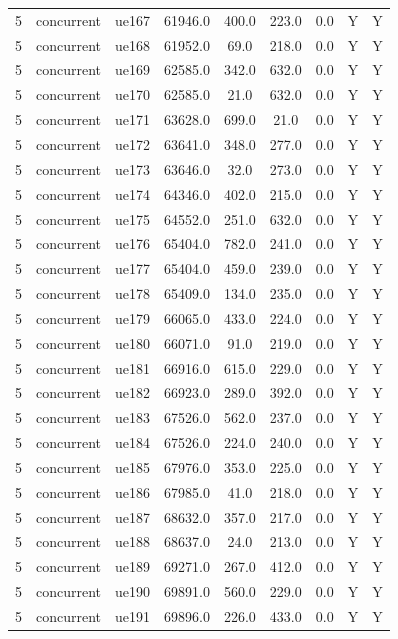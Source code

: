 \begin{table}[ht]
\begin{tabular}{|c|c|c|c|c|c|c|c|c|}
5 & concurrent & ue167 & 61946.0 & 400.0 & 223.0 & 0.0 & Y & Y \\
5 & concurrent & ue168 & 61952.0 & 69.0 & 218.0 & 0.0 & Y & Y \\
5 & concurrent & ue169 & 62585.0 & 342.0 & 632.0 & 0.0 & Y & Y \\
5 & concurrent & ue170 & 62585.0 & 21.0 & 632.0 & 0.0 & Y & Y \\
5 & concurrent & ue171 & 63628.0 & 699.0 & 21.0 & 0.0 & Y & Y \\
5 & concurrent & ue172 & 63641.0 & 348.0 & 277.0 & 0.0 & Y & Y \\
5 & concurrent & ue173 & 63646.0 & 32.0 & 273.0 & 0.0 & Y & Y \\
5 & concurrent & ue174 & 64346.0 & 402.0 & 215.0 & 0.0 & Y & Y \\
5 & concurrent & ue175 & 64552.0 & 251.0 & 632.0 & 0.0 & Y & Y \\
5 & concurrent & ue176 & 65404.0 & 782.0 & 241.0 & 0.0 & Y & Y \\
5 & concurrent & ue177 & 65404.0 & 459.0 & 239.0 & 0.0 & Y & Y \\
5 & concurrent & ue178 & 65409.0 & 134.0 & 235.0 & 0.0 & Y & Y \\
5 & concurrent & ue179 & 66065.0 & 433.0 & 224.0 & 0.0 & Y & Y \\
5 & concurrent & ue180 & 66071.0 & 91.0 & 219.0 & 0.0 & Y & Y \\
5 & concurrent & ue181 & 66916.0 & 615.0 & 229.0 & 0.0 & Y & Y \\
5 & concurrent & ue182 & 66923.0 & 289.0 & 392.0 & 0.0 & Y & Y \\
5 & concurrent & ue183 & 67526.0 & 562.0 & 237.0 & 0.0 & Y & Y \\
5 & concurrent & ue184 & 67526.0 & 224.0 & 240.0 & 0.0 & Y & Y \\
5 & concurrent & ue185 & 67976.0 & 353.0 & 225.0 & 0.0 & Y & Y \\
5 & concurrent & ue186 & 67985.0 & 41.0 & 218.0 & 0.0 & Y & Y \\
5 & concurrent & ue187 & 68632.0 & 357.0 & 217.0 & 0.0 & Y & Y \\
5 & concurrent & ue188 & 68637.0 & 24.0 & 213.0 & 0.0 & Y & Y \\
5 & concurrent & ue189 & 69271.0 & 267.0 & 412.0 & 0.0 & Y & Y \\
5 & concurrent & ue190 & 69891.0 & 560.0 & 229.0 & 0.0 & Y & Y \\
5 & concurrent & ue191 & 69896.0 & 226.0 & 433.0 & 0.0 & Y & Y \\

\end{tabular}
\end{table}
